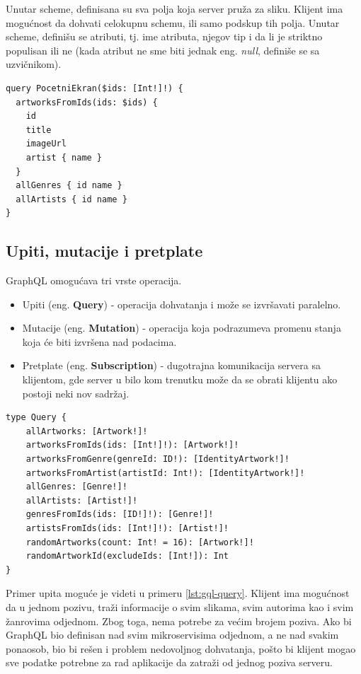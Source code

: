 \documentclass[12pt,oneside]{memoir}
\begin{document}
Unutar scheme, definisana su sva polja koja server pruža za sliku. Klijent ima mogućnost da dohvati celokupnu schemu, 
ili samo podskup tih polja. Unutar scheme, definišu se atributi, tj. ime atributa, njegov tip i da li je striktno 
populisan ili ne (kada atribut ne sme biti jednak eng. \textit{null}, definiše se sa uzvičnikom).

\begin{lstlisting}[language=GraphQLSchema,
  caption={Jedan upit koji zamenjuje tri REST poziva},
  label={lst:gql-upit}]
query PocetniEkran($ids: [Int!]!) {
  artworksFromIds(ids: $ids) {
    id
    title
    imageUrl
    artist { name }
  }
  allGenres { id name }
  allArtists { id name }
}
\end{lstlisting}

\subsection{Upiti, mutacije i pretplate}

GraphQL omogućava tri vrste operacija. 

\begin{itemize}
  \item Upiti (eng. \textbf{Query}) - operacija dohvatanja i može se izvršavati paralelno.
  \item Mutacije (eng. \textbf{Mutation}) - operacija koja podrazumeva promenu stanja koja će biti izvršena nad podacima.
  \item Pretplate (eng. \textbf{Subscription}) - dugotrajna komunikacija servera sa klijentom, gde server u bilo kom trenutku može da se obrati klijentu ako postoji neki nov sadržaj.
\end{itemize}

\begin{lstlisting}[language=GraphQLSchema,
  caption={Primer upita nad slikama},
  label={lst:gql-query}]
type Query {
    allArtworks: [Artwork!]!
    artworksFromIds(ids: [Int!]!): [Artwork!]!
    artworksFromGenre(genreId: ID!): [IdentityArtwork!]!
    artworksFromArtist(artistId: Int!): [IdentityArtwork!]!
    allGenres: [Genre!]!
    allArtists: [Artist!]!
    genresFromIds(ids: [ID!]!): [Genre!]!
    artistsFromIds(ids: [Int!]!): [Artist!]!
    randomArtworks(count: Int! = 16): [Artwork!]!
    randomArtworkId(excludeIds: [Int!]): Int
}
\end{lstlisting}

Primer upita moguće je videti u primeru \ref{lst:gql-query}. Klijent ima mogućnost da u jednom pozivu, traži informacije 
o svim slikama, svim autorima kao i svim žanrovima odjednom. Zbog toga, nema potrebe za većim brojem poziva. Ako bi 
GraphQL bio definisan nad svim mikroservisima odjednom, a ne nad svakim ponaosob, bio bi rešen i problem nedovoljnog dohvatanja, 
pošto bi klijent mogao sve podatke potrebne za rad aplikacije da zatraži od jednog poziva serveru. 
\end{document}
